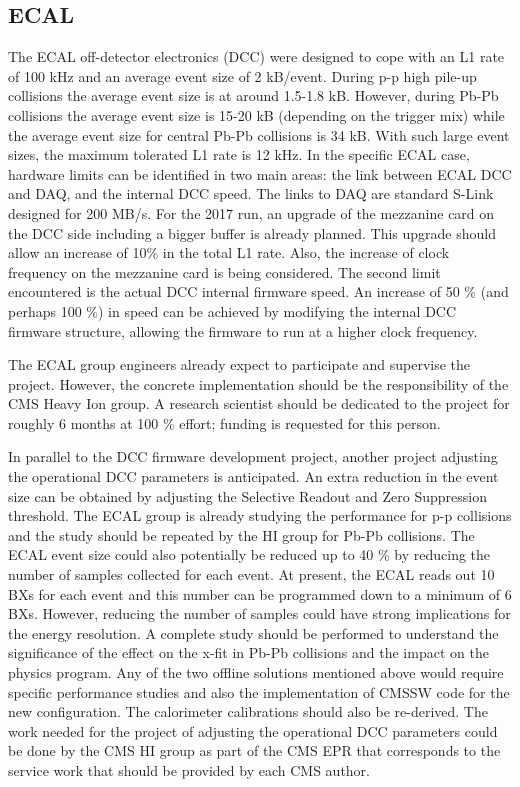\subsection{ECAL\label{subsec:ECAL}} 
The ECAL off-detector electronics (DCC) were designed to cope with an L1 rate of 100 kHz and an average event size of 2 kB/event. During p-p high pile-up collisions the average event size is at around 1.5-1.8 kB. However, during Pb-Pb collisions the average event size is 15-20 kB (depending on the trigger mix) while the average event size for central Pb-Pb collisions is 34 kB. With such large event sizes, the maximum tolerated L1 rate is 12 kHz. In the specific ECAL case, hardware limits can be identified in two main areas: the link between ECAL DCC and DAQ, and the internal DCC speed. The links to DAQ are standard S-Link designed for 200 MB/s. For the 2017 run, an upgrade of the mezzanine card on the DCC side including a bigger buffer is already planned. This upgrade should allow an increase of 10\% in the total L1 rate. Also, the increase of clock frequency on the mezzanine card is being considered. The second limit encountered is the actual DCC internal firmware speed. An increase of 50 \% (and perhaps 100 \%) in speed can be achieved by modifying the internal DCC firmware structure, allowing the firmware to run at a higher clock frequency. 

The ECAL group engineers already expect to participate and supervise the project. However, the concrete implementation should be the responsibility of the CMS Heavy Ion group. A research scientist should be dedicated to the project for roughly 6 months at 100 \% effort; funding is requested for this person.

In parallel to the DCC firmware development project, another project adjusting the operational DCC parameters is anticipated. An extra reduction in the event size can be obtained by adjusting the Selective Readout and Zero Suppression threshold. The ECAL group is already studying the performance for p-p collisions and the study should be repeated by the HI group for Pb-Pb collisions. The ECAL event size could also potentially be reduced up to 40 \% by reducing the number of samples collected for each event. At present, the ECAL reads out 10 BXs for each event and this number can be programmed down to a minimum of 6 BXs. However, reducing the number of samples could have strong implications for the energy resolution. A complete study should be performed to understand the significance of the effect on the x-fit in Pb-Pb collisions and the impact on the physics program. Any of the two offline solutions mentioned above would require specific performance studies and also the implementation of CMSSW code for the new configuration. The calorimeter calibrations should also be re-derived. The work needed for the project of adjusting the operational DCC parameters could be done by the CMS HI group as part of the CMS EPR that corresponds to the service work that should be provided by each CMS author.  




